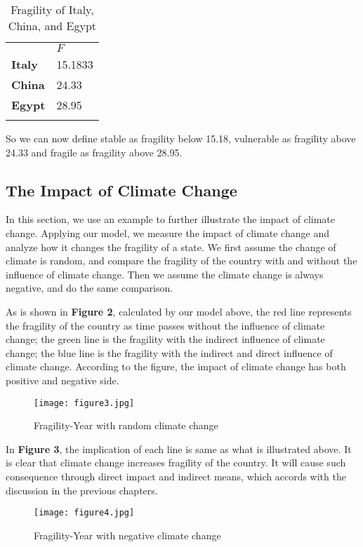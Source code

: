 \documentclass{mcmthesis}
\newlength\savedwidth
\newcommand\whline{\noalign{\global\savedwidth\arrayrulewidth
		\global\arrayrulewidth 1.2pt}%
	\hline
	\noalign{\global\arrayrulewidth\savedwidth}}
\newlength\savewidth
\newcommand\shline{\noalign{\global\savewidth\arrayrulewidth
		\global\arrayrulewidth 1.2pt}%
	\hline
	\noalign{\global\arrayrulewidth\savewidth}}
\begin{document}
	\begin{table}[htbp]
		\renewcommand\arraystretch{1.5}
		\footnotesize
		\centering
		\begin{tabular}{m{2cm}<{\centering}|m{5cm}<{\centering}}
			\whline
			&\textbf{$F$}\\
			\whline
			\textbf{Italy} & 15.1833\\
			
			\textbf{China} & 24.33\\
			
			\textbf{Egypt} & 28.95\\
			
			\shline
		\end{tabular}
		\caption{Fragility of Italy, China, and Egypt}\label{tab:Fragility  of Italy, China, and Egypt}
	\end{table}
	
	So we can now define stable as fragility below 15.18, vulnerable as fragility above 24.33 and fragile as fragility above 28.95.
	
	\subsection{The Impact of Climate Change}
	
	In this section, we use an example to further illustrate the impact of climate change. Applying our model, we measure the impact of climate change and analyze how it changes the fragility of a state. We first assume the change of climate is random, and compare the fragility of the country with and without the influence of climate change. Then we assume the climate change is always negative, and do the same comparison.
	
	As is shown in \textbf{Figure 2},  calculated by our model above, the red line represents the fragility of the country as time passes without the influence of climate change; the green line is the fragility with the indirect influence of climate change; the blue line is the fragility with the indirect and direct influence of climate change. According to the figure, the impact of climate change has both positive and negative side. 
	\begin{figure}[h]
		\small
		\centering
		\texttt{[image: figure3.jpg]}
		\caption{Fragility-Year with random climate change} \label{fig:Fragility-Year with random climate change}
	\end{figure}

	In \textbf{Figure 3}, the implication of each line is same as what is illustrated above. It is clear that climate change increases fragility of the country. It will cause such consequence through direct impact and indirect means, which accords with the discussion in the previous chapters.
	\begin{figure}[h]
		\small
		\centering
		\texttt{[image: figure4.jpg]}
		\caption{Fragility-Year with negative climate change} \label{fig:Fragility-Year with negative climate change}
	\end{figure}
	
\end{document}
